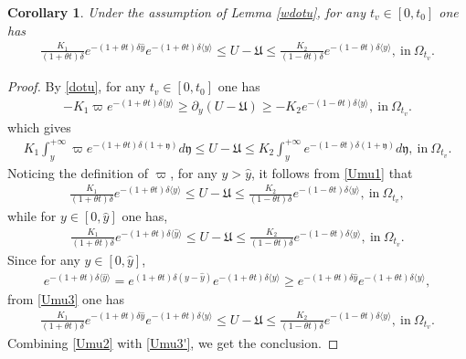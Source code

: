 \documentclass{amsart}
\numberwithin{equation}{section}
\newtheorem{corollary}{Corollary}[section]
\newcommand\y{{{\langle y \rangle}}}
\begin{document}
\begin{corollary}\label{wdotuC}
Under the assumption of Lemma \ref{wdotu}, for any $t_{v}\in[0,t_{0}]$ one has
\begin{align}\label{Umu}
\frac{K_{1}}{(1+\theta t)\delta}e^{-(1+\theta t)\delta\hat{y}}e^{-(1+\theta t)\delta\y}
\leq U-\mathfrak{U}
\leq \frac{K_{2}}{(1-\theta t)\delta}e^{-(1-\theta t)\delta\y}, ~\text{in}~\Omega_{t_{v}}.
\end{align}
\end{corollary}
\begin{proof}
By \eqref{dotu}, for any $t_{v}\in[0,t_{0}]$ one has
\begin{align*}
-K_{1}\varpi e^{-(1+\theta t)\delta\y}\geq \partial_{y}(U-\mathfrak{U})\geq -K_{2}e^{-(1-\theta t)\delta\y}, ~\text{in}~\Omega_{t_{v}}.
\end{align*}
which gives
\begin{align}\label{Umu1}
K_{1}\int_{y}^{+\infty}\varpi e^{-(1+\theta t)\delta(1+\mathfrak{y})}d\mathfrak{y}
\leq U-\mathfrak{U}
\leq K_{2}\int_{y}^{+\infty}e^{-(1-\theta t)\delta(1+\mathfrak{y})}d\mathfrak{y}, ~\text{in}~\Omega_{t_{v}}.
\end{align}
Noticing the definition of $\varpi$, for any $y>\hat{y}$, it follows from \eqref{Umu1} that
\begin{align}\label{Umu2}
\frac{K_{1}}{(1+\theta t)\delta}e^{-(1+\theta t)\delta\y}\leq U-\mathfrak{U}\leq \frac{K_{2}}{(1-\theta t)\delta}e^{-(1-\theta t)\delta\y}, ~\text{in}~\Omega_{t_{v}},
\end{align}
while for $y\in[0,\hat{y}]$ one has,
\begin{align}\label{Umu3}
\frac{K_{1}}{(1+\theta t)\delta}e^{-(1+\theta t)\delta\langle\hat{y}\rangle}
\leq U-\mathfrak{U}
\leq \frac{K_{2}}{(1-\theta t)\delta}e^{-(1-\theta t)\delta\y}, ~\text{in}~\Omega_{t_{v}}.
\end{align}
Since for any $y\in[0,\hat{y}]$,
\begin{align*}
e^{-(1+\theta t)\delta\langle\hat{y}\rangle}
= e^{(1+\theta t)\delta(y-\hat{y})}e^{-(1+\theta t)\delta\y}
\geq e^{-(1+\theta t)\delta\hat{y}}e^{-(1+\theta t)\delta\y},
\end{align*}
from \eqref{Umu3} one has
\begin{align}\label{Umu3'}
\frac{K_{1}}{(1+\theta t)\delta}e^{-(1+\theta t)\delta\hat{y}}e^{-(1+\theta t)\delta\y}
\leq U-\mathfrak{U}
\leq \frac{K_{2}}{(1-\theta t)\delta}e^{-(1-\theta t)\delta\y}, ~\text{in}~\Omega_{t_{v}}.
\end{align}
Combining \eqref{Umu2} with \eqref{Umu3'}, we get the conclusion.
\end{proof}
\end{document}
